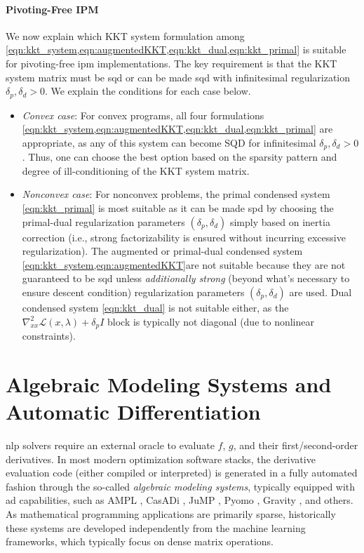 \documentclass{article}
\begin{document}
\paragraph{Pivoting-Free IPM}
We now explain which KKT system formulation among \cref{eqn:kkt_system,eqn:augmentedKKT,eqn:kkt_dual,eqn:kkt_primal} is suitable for pivoting-free \gls*{ipm} implementations. The key requirement is that the KKT system matrix must be \gls*{sqd} or can be made \gls*{sqd} with infinitesimal regularization $\delta_p, \delta_d > 0$. We explain the conditions for each case below.
\begin{itemize}[leftmargin=*,itemsep=0pt,parsep=0pt,partopsep=0pt]
\item \textit{Convex case}:
  For convex programs, all four formulations \cref{eqn:kkt_system,eqn:augmentedKKT,eqn:kkt_dual,eqn:kkt_primal} are appropriate, as any of this system can become SQD for infinitesimal $\delta_p, \delta_d > 0$.
  Thus, one can choose the best option based on the sparsity pattern and degree of ill-conditioning of the KKT system matrix.  
\item \textit{Nonconvex case}:
  For nonconvex problems, the primal condensed system \cref{eqn:kkt_primal} is most suitable as it can be made \gls*{spd} by choosing the primal-dual regularization parameters $(\delta_p, \delta_d)$ simply based on inertia correction (i.e., strong factorizability is ensured without incurring excessive regularization).
  The augmented or primal-dual condensed system \cref{eqn:kkt_system,eqn:augmentedKKT}are not suitable because they are not guaranteed to be \gls*{sqd} unless \emph{additionally strong} (beyond what's necessary to ensure descent condition) regularization parameters $(\delta_p, \delta_d)$ are used.
  Dual condensed system \cref{eqn:kkt_dual} is not suitable either, as the $\nabla^2_{x x} \mathcal{L}(x, \lambda) + \delta_p I$ block is typically not diagonal (due to nonlinear constraints).
\end{itemize}



\section{Algebraic Modeling Systems and Automatic Differentiation}\label{eqn:ad}
\Gls*{nlp} solvers require an external oracle to evaluate $f$, $g$, and their first/second-order derivatives. In most modern optimization software stacks, the derivative evaluation code (either compiled or interpreted) is generated in a fully automated fashion through the so-called \emph{algebraic modeling systems}, typically equipped with \gls*{ad} capabilities, such as AMPL \cite{fourerModelingLanguageMathematical1990}, CasADi \cite{anderssonCasADiSoftwareFramework2019}, JuMP \cite{dunningJuMPModelingLanguage2017}, Pyomo \cite{hartPyomoModelingSolving2011}, Gravity \cite{hijaziGravityMathematicalModeling2018}, and others. As mathematical programming applications are primarily sparse, historically these systems are developed independently from the machine learning frameworks, which typically focus on dense matrix operations.
\end{document}
